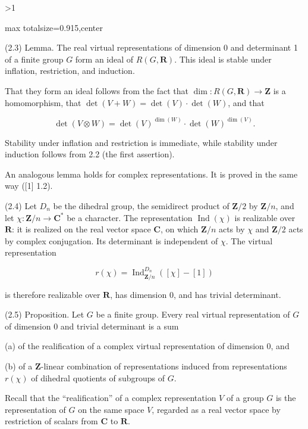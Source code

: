 \documentclass[9pt,twoside]{extarticle}
\newcommand{\EditionPage}[3]{%
  \ifnum#1>1\clearpage\fi
  \pdfbookmark[1]{Printed folio #2}{en-folio-#2}%
  \hypertarget{en-page-#1}{}%
  \noindent\begin{adjustbox}{max totalsize={\textwidth}{0.915\textheight},center}
  \begin{minipage}[t]{\textwidth}
  \fontsize{8.45}{10.05}\selectfont\justifying
  #3
  \end{minipage}
  \end{adjustbox}%
}
\begin{document}
\EditionPage{6}{304}{%
(2.3) Lemma. The real virtual representations of dimension 0 and determinant 1 of a finite group \(G\) form an ideal of \(R(G,\mathbf R)\). This ideal is stable under inflation, restriction, and induction.\par

That they form an ideal follows from the fact that \(\dim:R(G,\mathbf R)\to\mathbf Z\) is a homomorphism, that \(\det(V+W)=\det(V)\cdot\det(W)\), and that\par

\[
\det(V\otimes W)=\det(V)^{\dim(W)}\cdot\det(W)^{\dim(V)}.
\]

Stability under inflation and restriction is immediate, while stability under induction follows from 2.2 (the first assertion).\par

An analogous lemma holds for complex representations. It is proved in the same way ([1] 1.2).\par

(2.4) Let \(D_n\) be the dihedral group, the semidirect product of \(\mathbf Z/2\) by \(\mathbf Z/n\), and let \(\chi:\mathbf Z/n\to\mathbf C^*\) be a character. The representation \(\operatorname{Ind}(\chi)\) is realizable over \(\mathbf R\): it is realized on the real vector space \(\mathbf C\), on which \(\mathbf Z/n\) acts by \(\chi\) and \(\mathbf Z/2\) acts by complex conjugation. Its determinant is independent of \(\chi\). The virtual representation\par

\[
r(\chi)=\operatorname{Ind}_{\mathbf Z/n}^{D_n}([\chi]-[1])
\]

is therefore realizable over \(\mathbf R\), has dimension 0, and has trivial determinant.\par

(2.5) Proposition. Let \(G\) be a finite group. Every real virtual representation of \(G\) of dimension 0 and trivial determinant is a sum\par

(a) of the realification of a complex virtual representation of dimension 0, and\par

(b) of a \(\mathbf Z\)-linear combination of representations induced from representations \(r(\chi)\) of dihedral quotients of subgroups of \(G\).\par

Recall that the “realification” of a complex representation \(V\) of a group \(G\) is the representation of \(G\) on the same space \(V\), regarded as a real vector space by restriction of scalars from \(\mathbf C\) to \(\mathbf R\).\par

}
\end{document}
